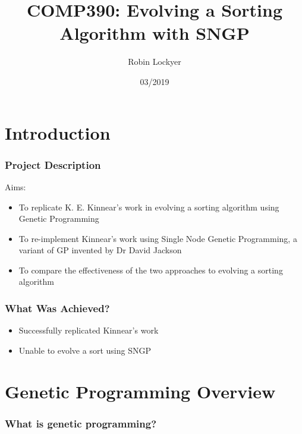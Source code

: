 \documentclass{beamer}
\title{COMP390: Evolving a Sorting Algorithm with SNGP}
\author{Robin Lockyer}
\institute{University of Liverpool}
\date{03/2019}
\begin{document}
	
	\frame{\titlepage}
	
	\frame{\tableofcontents}
	
	\section{Introduction}
	
		\begin{frame}
		
			\frametitle{Project Description}
			
			Aims:
			
			\begin{itemize}
				
				\item To replicate K. E. Kinnear's work \cite{kinnear_evolving_1993} in evolving a sorting algorithm using Genetic Programming
				
				\item To re-implement Kinnear's work using Single Node Genetic Programming, a variant of GP invented by Dr David Jackson \cite{jackson_new_2012}
				
				\item To compare the effectiveness of the two approaches to evolving a sorting algorithm
				 
			\end{itemize}
			
			
		\end{frame}
	
		\begin{frame}
		
			\frametitle{What Was Achieved?}
			
			\begin{itemize}
				\item Successfully replicated Kinnear's work
				\item Unable to evolve a sort using SNGP
			\end{itemize}
			
		\end{frame}
	
	\section{Genetic Programming Overview}
		
		\begin{frame}
		
			\frametitle{What is genetic programming?}
			
			
		
		\end{frame}
	
\end{document}
